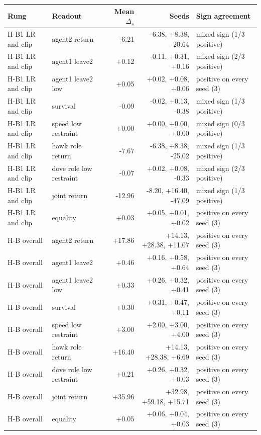 \begin{tabular}{llrrl}
\toprule
Rung & Readout & Mean $\Delta_s$ & Seeds & Sign agreement \\
\midrule
H-B1 LR and clip & agent2 return & -6.21 & -6.38, +8.38, -20.64 & mixed sign (1/3 positive) \\
H-B1 LR and clip & agent1 leave2 & +0.12 & -0.11, +0.31, +0.16 & mixed sign (2/3 positive) \\
H-B1 LR and clip & agent1 leave2 low & +0.05 & +0.02, +0.08, +0.06 & positive on every seed (3) \\
H-B1 LR and clip & survival & -0.09 & -0.02, +0.13, -0.38 & mixed sign (1/3 positive) \\
H-B1 LR and clip & speed low restraint & +0.00 & +0.00, +0.00, +0.00 & mixed sign (0/3 positive) \\
H-B1 LR and clip & hawk role return & -7.67 & -6.38, +8.38, -25.02 & mixed sign (1/3 positive) \\
H-B1 LR and clip & dove role low restraint & -0.07 & +0.02, +0.08, -0.33 & mixed sign (2/3 positive) \\
H-B1 LR and clip & joint return & -12.96 & -8.20, +16.40, -47.09 & mixed sign (1/3 positive) \\
H-B1 LR and clip & equality & +0.03 & +0.05, +0.01, +0.02 & positive on every seed (3) \\
H-B overall & agent2 return & +17.86 & +14.13, +28.38, +11.07 & positive on every seed (3) \\
H-B overall & agent1 leave2 & +0.46 & +0.16, +0.58, +0.64 & positive on every seed (3) \\
H-B overall & agent1 leave2 low & +0.33 & +0.26, +0.32, +0.41 & positive on every seed (3) \\
H-B overall & survival & +0.30 & +0.31, +0.47, +0.11 & positive on every seed (3) \\
H-B overall & speed low restraint & +3.00 & +2.00, +3.00, +4.00 & positive on every seed (3) \\
H-B overall & hawk role return & +16.40 & +14.13, +28.38, +6.69 & positive on every seed (3) \\
H-B overall & dove role low restraint & +0.21 & +0.26, +0.32, +0.03 & positive on every seed (3) \\
H-B overall & joint return & +35.96 & +32.98, +59.18, +15.71 & positive on every seed (3) \\
H-B overall & equality & +0.05 & +0.06, +0.04, +0.03 & positive on every seed (3) \\

\end{tabular}

